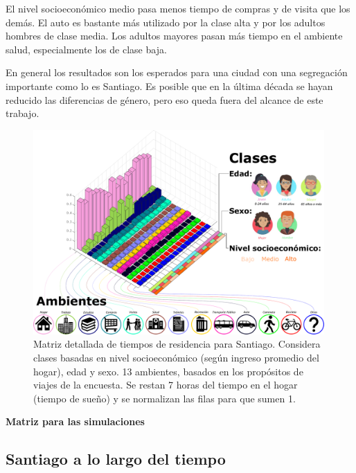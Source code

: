 El nivel socioeconómico medio pasa menos tiempo de compras y de visita que los demás. El auto es bastante más utilizado por la clase alta y por los adultos hombres de clase media. Los adultos mayores pasan más tiempo en el ambiente salud, especialmente los de clase baja.

En general los resultados son los esperados para una ciudad con una segregación importante como lo es Santiago. Es posible que en la última década se hayan reducido las diferencias de género, pero eso queda fuera del alcance de este trabajo.


\begin{figure}[h]
\centering
\includegraphics[width=0.99\textwidth]{img/resultados/matrixP/matriz Pambientesyclases.pdf}
\caption[Matriz detallada de tiempos de residencia para Santiago]{Matriz detallada de tiempos de residencia para Santiago. Considera clases basadas en nivel socioeconómico (según ingreso promedio del hogar), edad y sexo. 13 ambientes, basados en los propósitos de viajes de la encuesta. Se restan 7 horas del tiempo en el hogar (tiempo de sueño) y se normalizan las filas para que sumen 1.}
\label{img:Pmatrix-full}
\end{figure}


\noindent \textbf{Matriz para las simulaciones}


\subsection{Santiago a lo largo del tiempo}